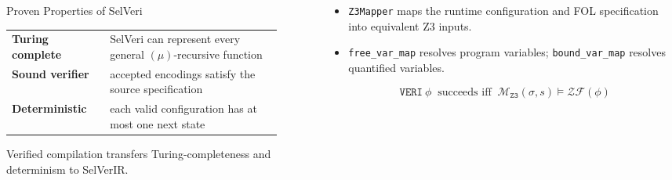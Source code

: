 \documentclass[final]{beamer}
\newcommand{\posterbodyfont}{\fontsize{24}{31}\selectfont}
\newcommand{\postercaptionfont}{\fontsize{18}{23}\selectfont}
\begin{document}
\begin{frame}[t,fragile]
\begin{columns}[t,totalwidth=\textwidth]
\begin{column}{0.245\textwidth}
\begin{posterbox}[height=25.21cm,compactboxtitle]{Proven Properties of SelVeri}
{\vspace{0.25cm}
\begin{mathbox}[left=0.28cm,right=0.28cm,top=0.24cm,bottom=0.24cm]
\begin{center}
\renewcommand{\arraystretch}{1.14}
\begin{tabular}{p{0.32\linewidth}p{0.56\linewidth}}
\textbf{Turing complete} & SelVeri can represent every general $(\mu)$-recursive function \\
\textbf{Sound verifier} & accepted encodings satisfy the source specification \\
\textbf{Deterministic} & each valid configuration has at most one next state
\end{tabular}
\end{center}
\end{mathbox}

\vspace{0.12cm}
\begin{center}
{\postercaptionfont Verified compilation transfers Turing-completeness and determinism to SelVerIR.}
\end{center}
}
\end{posterbox}
\end{column}

\begin{column}{0.245\textwidth}
\begin{posterbox}[height=16cm,compactboxtitle]{}
{\posterbodyfont
\begin{itemize}
  \item \texttt{Z3Mapper} maps the runtime configuration and FOL specification into equivalent Z3 inputs.
  \item \texttt{free\_var\_map} resolves program variables; \texttt{bound\_var\_map} resolves quantified variables.
\end{itemize}

\vspace{0.15cm}
\begin{mathbox}[left=0.25cm,right=0.25cm,top=0.18cm,bottom=0.18cm]
\[
\mathtt{VERI}\ \phi\ \text{ succeeds iff }\ 
\mathcal{M}_{\mathtt{Z3}}(\sigma,s)\models\mathcal{ZF}(\phi)
\]
\end{mathbox}

}
\end{posterbox}
\end{column}
\end{columns}
\end{frame}
\end{document}
